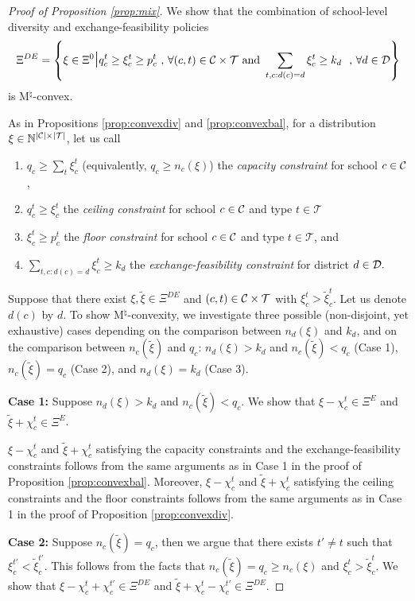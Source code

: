 \documentclass[12pt]{amsart}
\theoremstyle{remark}
\def\T{\mathcal{T}} \def\calt{\mathcal{T}}
\begin{document}
\begin{proof}[Proof of Proposition \ref{prop:mix}]
We show that the combination of school-level diversity and exchange-feasibility policies
\[\Xi^{DE} = \left\{\xi \in \Xi^0 \mathlarger{\mathlarger{\mid}} q_c^t \geq \xi_c^t \geq p_c^t \text{ , } \forall (c,t)\in \calc \times \calt \mbox{ and }  \sum_{t,c:d(c) = d} \xi_c^t \geq k_{d} \text{ } \text{ , } \forall d \in \cald \right\}\]
is M$^{\natural}$-convex.

As in Propositions \ref{prop:convexdiv} and \ref{prop:convexbal}, for a distribution $\xi \in \mathbb N^{|\C|\times |\T|}$, let us call
\begin{enumerate}
\item $q_c \geq \sum_t \xi_c^t$ (equivalently, $q_c \geq n_c(\xi)$) the \emph{capacity constraint} for school $c\in \mathcal{C}$,
\item $q_c^t \geq \xi_c^t$ the \emph{ceiling constraint} for school $c\in \mathcal{C}$ and type $t\in \calt$
\item $\xi_c^t \geq p_c^t$ the \emph{floor constraint} for school $c\in \mathcal{C}$ and type $t\in \calt$, and
\item $\sum_{t,c:d(c)=d} \xi_c^t \geq k_{d}$  the \emph{exchange-feasibility constraint} for district $d \in \mathcal{D}.$
\end{enumerate}

Suppose that there exist $\xi,\tilde{\xi}\in \Xi^{DE}$ and $(c,t) \in \calc \times \calt$ with $\xi_c^t>\tilde{\xi}_{c}^{t}$. Let us denote $d(c)$ by $d$.
To show M$^{\natural}$-convexity, we investigate three possible (non-disjoint, yet exhaustive) cases depending on the comparison between $n_d(\xi)$ and $k_{d}$,
and on the comparison between $n_c(\tilde \xi)$ and $q_c$: $n_d(\xi) > k_{d}$ and $n_c(\tilde \xi) < q_c$ (Case 1), $n_c(\tilde \xi) = q_c$ (Case 2), and $n_d(\xi) = k_{d}$ (Case 3).


\textbf{Case 1:} Suppose $n_d(\xi) > k_{d}$ and $n_c(\tilde \xi) < q_c$. We show that $\xi-\chi_c^t \in \Xi^E$ and $\tilde{\xi}+\chi_c^t \in \Xi^E$.

$\xi-\chi_c^t$ and $\tilde{\xi}+\chi_c^t$ satisfying the capacity constraints and the exchange-feasibility constraints follows from the same arguments as in Case 1 in the proof of Proposition \ref{prop:convexbal}. Moreover, $\xi-\chi_c^t$ and $\tilde{\xi}+\chi_c^t$ satisfying the ceiling constraints and the floor constraints follows from the same arguments as in Case 1 in the proof of Proposition \ref{prop:convexdiv}.

\textbf{Case 2:} Suppose $n_c(\tilde \xi) = q_c$, then we argue that there exists $t' \neq t$ such that $\xi_c^{t'} < \tilde{\xi}_{c}^{t'}$. This follows from the facts that $n_c(\tilde \xi) = q_c \geq n_c(\xi)$ and $\xi_c^t>\tilde{\xi}_{c}^{t}$. We show that $\xi-\chi_c^t+\chi_{c}^{t'} \in \Xi^{DE}$ and $\tilde{\xi}+\chi_c^t-\chi_{c}^{t'}\in \Xi^{DE}$.


\end{proof}
\end{document}
